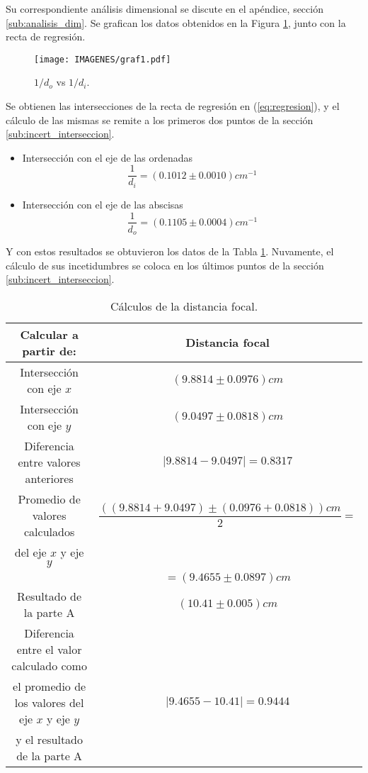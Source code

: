 \documentclass[10pt,a4paper]{article}
\begin{document}
Su correspondiente análisis dimensional se discute en el apéndice, sección \ref{sub:analisis_dim}.
Se grafican los datos obtenidos en la Figura \ref{fig:identidad}, junto con la recta de regresión.
\begin{figure}[ht]
\centering
\texttt{[image: IMAGENES/graf1.pdf]}
	\caption{\small \(1/d_o\) vs \(1/d_i\).}
\label{fig:identidad}
\end{figure}
\newpage
Se obtienen las intersecciones de la recta de regresión en (\ref{eq:regresion}), y el cálculo de las mismas se remite a los primeros dos puntos de la sección \ref{sub:incert_interseccion}.
\begin{multicols}{2}
\begin{itemize}
	\item Intersección con el eje de las ordenadas
	$$\dfrac{1}{d_i}=(0.1012\pm 0.0010) cm^{-1}$$
	\item Intersección con el eje de las abscisas
	$$\dfrac{1}{d_o}=(0.1105\pm 0.0004) cm^{-1} $$
\end{itemize}
\end{multicols}
Y con estos resultados se obtuvieron los datos de la Tabla \ref{tab:exp4}. Nuvamente, el cálculo de sus incetidumbres se coloca en los últimos puntos de la sección \ref{sub:incert_interseccion}.
\begin{table}[ht]
\centering
\caption{Cálculos de la distancia focal.}
\begin{tabular}{|c|c|}
\hline
Calcular a partir de: & Distancia focal \\ \hline
Intersección con eje $x$ & $(9.8814\pm0.0976)cm$\\  \hline
Intersección con eje $y$ & $(9.0497\pm 0.0818)cm$\\  \hline
Diferencia entre valores anteriores & $|9.8814-9.0497|=0.8317 $\\ \hline
Promedio de valores calculados  & $\dfrac{((9.8814+9.0497)\pm (0.0976+0.0818))cm}{2}=$\\ del eje $x$ y eje $y$ & \\
& $=(9.4655\pm 0.0897)cm$ \\ \hline
Resultado de la parte A & $(10.41\pm0.005) cm$ \\ \hline
Diferencia entre el valor calculado como & \\
el promedio de los valores del eje $x$ y eje $y$ & $|9.4655-10.41|=0.9444$ \\
y el resultado de la parte A & \\ \hline
\end{tabular}
	\label{tab:exp4}
\end{table}
\end{document}
